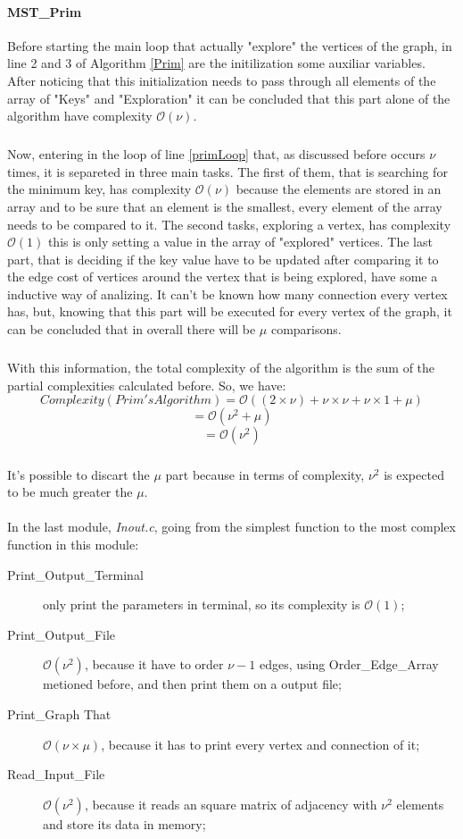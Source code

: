 \documentclass[titlepage]{article}
\begin{document}
    \paragraph{MST\_Prim}
    Before starting the main loop that actually "explore" the vertices of the graph, in line 2 and 3 of Algorithm \ref{Prim} are the initilization some auxiliar variables. After noticing that this initialization needs to pass through all elements of the array of "Keys" and "Exploration" it can be concluded that this part alone of the algorithm have complexity $\mathcal{O}(\nu)$.
    \subparagraph{}
    Now, entering in the loop of line \ref{primLoop} that, as discussed before occurs $\nu$ times, it is separeted in three main tasks. The first of them, that is searching for the minimum key, has complexity $\mathcal{O}(\nu)$ because the elements are stored in an array and to be sure that an element is the smallest, every element of the array needs to be compared to it. The second tasks, exploring a vertex, has complexity $\mathcal{O}(1)$ this is only setting a value in the array of "explored" vertices. The last part, that is deciding if the key value have to be updated after comparing it to the edge cost of vertices around the vertex that is being explored, have some a inductive way of analizing. It can't be known how many connection every vertex has, but, knowing that this part will be executed for every vertex of the graph, it can be concluded that in overall there will be $\mu$ comparisons.
    \subparagraph{}
    With this information, the total complexity of the algorithm is the sum of the partial complexities calculated before. So, we have:
    $$
        Complexity(Prim's Algorithm) = \mathcal{O}((2 \times \nu) + \nu \times \nu + \nu \times 1 + \mu)
    $$
    $$
        = \mathcal{O}(\nu^2 + \mu)
    $$
    $$ 
        = \mathcal{O}(\nu^2)
    $$
    \subparagraph{}
    It's possible to discart the $\mu$ part because in terms of complexity, $\nu^2$ is expected to be much greater the $\mu$.
    \paragraph{}
    In the last module, \emph{Inout.c}, going from the simplest function to the most complex function in this module:
    \begin{description}
        \item[Print\_Output\_Terminal] only print the parameters in terminal, so its complexity is $\mathcal{O}(1)$;
        \item[Print\_Output\_File] $\mathcal{O}(\nu^2)$, because it have to order $\nu-1$ edges, using Order\_Edge\_Array metioned before, and then print them on a output file;
        \item[Print\_Graph That] $\mathcal{O}(\nu \times \mu)$, because it has to print every vertex and connection of it;
        \item[Read\_Input\_File] $\mathcal{O}(\nu^2)$, because it reads an square matrix of adjacency with $\nu^2$ elements and store its data in memory;
    \end{description}
\end{document}
